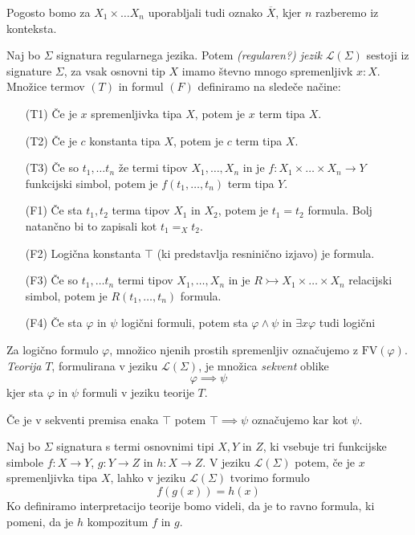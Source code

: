 \documentclass[../kategoricna_logika.tex]{subfiles}
\begin{document}
Pogosto bomo za $X_1 \times \ldots X_n$ uporabljali tudi oznako $\overline{X}$, kjer $n$ razberemo iz konteksta.
\begin{definicija}
  Naj bo $\Sigma$ signatura regularnega jezika. Potem \emph{(regularen?) jezik} $\mathcal{L}(\Sigma)$ sestoji iz signature $\Sigma$, za vsak osnovni tip $X$ imamo števno mnogo spremenljivk $x:X$. Množice termov $(T)$ in formul $(F)$ definiramo na sledeče načine:
  \begin{itemize}
    \item [(T1)] Če je $x$ spremenljivka tipa $X$, potem je $x$ term tipa $X$.
    \item [(T2)] Če je $c$ konstanta tipa $X$, potem je $c$ term tipa $X$.
    \item [(T3)] Če so $t_1, \ldots t_n$ že termi tipov $X_1, \ldots, X_n$ in je $f : X_1 \times \ldots \times X_n \to Y$ funkcijski simbol, potem je $f(t_1, \ldots, t_n)$ term tipa $Y$.
    \item [(F1)] Če sta $t_1, t_2$ terma tipov $X_1$ in $X_2$, potem je $t_1 = t_2$ formula. Bolj natančno bi to zapisali kot $t_1 =_X t_2$.
    \item [(F2)] Logična konstanta $\top$ (ki predstavlja resninično izjavo) je formula.
    \item [(F3)] Če so $t_1, \ldots t_n$ termi tipov $X_1, \ldots, X_n$ in je $R \rightarrowtail X_1 \times \ldots \times X_n$ relacijski simbol, potem je $R(t_1, \ldots, t_n)$ formula.
    \item [(F4)] Če sta $\varphi$ in $\psi$ logični formuli, potem sta $\varphi \wedge \psi$ in $\exists x \varphi$ tudi logični 
  \end{itemize}
  Za logično formulo $\varphi$, množico njenih prostih spremenljiv označujemo z $\mathrm{FV}(\varphi)$. \emph{Teorija} $T$, formulirana v jeziku $\mathcal{L}(\Sigma)$, je množica \emph{sekvent} oblike 
  $$\varphi \implies \psi$$
  kjer sta $\varphi$ in $\psi$ formuli v jeziku teorije $T$.
\end{definicija}
Če je v sekventi premisa enaka $\top$ potem $\top \implies \psi$ označujemo kar kot $\psi$.
\begin{primer}\label{primer:kompozitum}
  Naj bo $\Sigma$ signatura s termi osnovnimi tipi $X,Y$ in $Z$, ki vsebuje tri funkcijske simbole $f: X \to Y$, $g : Y \to Z$ in $h : X \to Z$. V jeziku $\mathcal{L}(\Sigma)$ potem, če je $x$ spremenljivka tipa $X$, lahko v jeziku $\mathcal{L}(\Sigma)$ tvorimo formulo
  $$f(g(x)) = h(x)$$
  Ko definiramo interpretacijo teorije bomo videli, da je to ravno formula, ki pomeni, da je $h$ kompozitum $f$ in $g$.
\end{primer}
\end{document}
